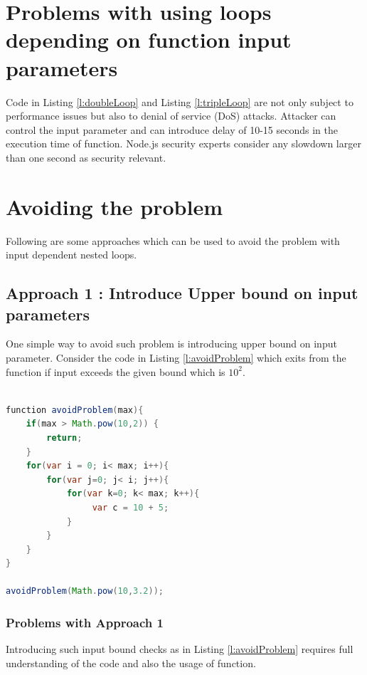 \documentclass[authoryear,preprint]{sigplanconf}
\begin{document}
\section{Problems with using loops depending on function input parameters}
\label{sec:problems}
Code in Listing \ref{l:doubleLoop} and Listing \ref{l:tripleLoop} are not only subject to performance issues but also to denial of service (DoS) attacks. Attacker can control the input parameter and can introduce delay of 10-15 seconds in the execution time of function. Node.js security experts consider any slowdown larger than one second as security relevant.

\section{Avoiding the problem}
\label{sec:avoiding}

Following are some approaches which can be used to avoid the problem with input dependent nested loops.

\subsection{Approach 1 : Introduce Upper bound on input parameters}
One simple way to avoid such problem is introducing upper bound on input parameter.
Consider the code in Listing \ref{l:avoidProblem} which exits from the function if input exceeds the given bound which is \begin{math} 10^{2} \end{math}.

\begin{lstlisting}[caption=avoidProblem function with 3 nested loop,label=l:avoidProblem,language=Java]

function avoidProblem(max){
	if(max > Math.pow(10,2)) {
		return;	
	}
    for(var i = 0; i< max; i++){
    	for(var j=0; j< i; j++){
    		for(var k=0; k< max; k++){
				 var c = 10 + 5;
 			}
 		}
 	}
}

avoidProblem(Math.pow(10,3.2));

\end{lstlisting}

\subsubsection{Problems with Approach 1}

Introducing such input bound checks as in Listing \ref{l:avoidProblem} requires full understanding of the code and also the usage of function.
\end{document}
